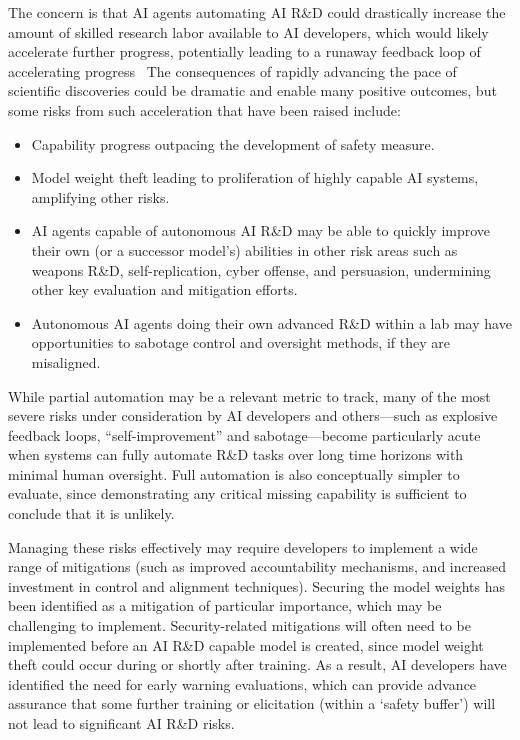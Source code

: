 \documentclass{article}
\begin{document}
The concern is that AI agents automating AI R\&D could drastically increase the amount of skilled research labor available to AI developers, which would likely accelerate further progress, potentially leading to a runaway feedback loop of accelerating progress~\cite{davidson2023compute, erdil2024estimating, erdil2024explosivegrowthaiautomation} The consequences of rapidly
advancing the pace of scientific discoveries could be dramatic and enable many positive outcomes,
but some risks from such acceleration that have been raised include:
\begin{itemize}
    \item Capability progress outpacing the development of safety measure\cite{openai2023preparedness}.
    \item Model weight theft leading to proliferation of highly capable AI systems, amplifying other risks\cite{deepmind2024frontier}.
    \item AI agents capable of autonomous AI R\&D may be able to quickly improve their own (or a successor model’s) abilities in other risk areas such as weapons R\&D, self-replication, cyber offense, and persuasion, undermining other key evaluation and mitigation efforts\cite{deepmind2024frontier}.
    \item Autonomous AI agents doing their own advanced R\&D within a lab may have opportunities to sabotage control and oversight methods, if they are misaligned\cite{benton2024sabotageevaluationsfrontiermodels}.
\end{itemize}

While partial automation may be a relevant metric to track, many of the most severe risks under consideration by AI developers and others---such as explosive feedback loops, ``self-improvement'' and sabotage---become particularly acute when systems can fully automate R\&D tasks over long time horizons with minimal human oversight. Full automation is also conceptually simpler to evaluate, since demonstrating any critical missing capability is sufficient to conclude that it is unlikely. 

Managing these risks effectively may require developers to implement a wide range of mitigations (such as improved accountability mechanisms, and increased investment in control and alignment
techniques). Securing the model weights has been identified as a mitigation of particular importance, which may be challenging to implement\cite{openai2023preparedness,deepmind2024frontier,Nevo2024}. Security-related mitigations will often need to
be implemented before an AI R\&D capable model is created, since model weight theft could occur during or shortly after training. As a result, AI developers have identified the need for early warning
evaluations, which can provide advance assurance that some further training or elicitation (within a ‘safety buffer’) will not lead to significant AI R\&D risks\cite{anthropic2024rsp,deepmind2024frontier}.
\end{document}
